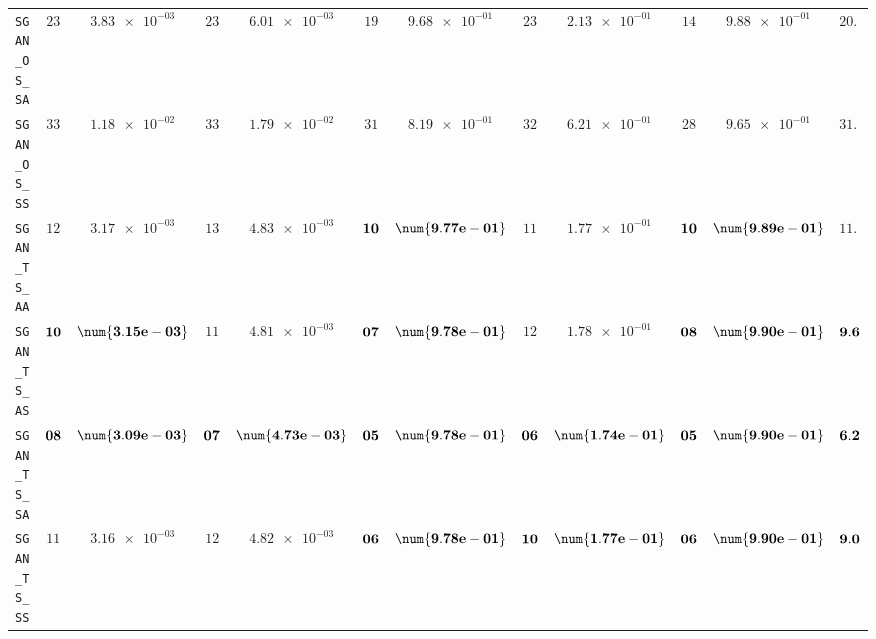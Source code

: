 \begin{xltabular}{\textwidth}{l||cC|cC|cC|cC|cC||c}
	\texttt{SGAN\_OS\_SA} & $ 23$ & $ \num{3.83e-03}$ & $ 23$ & $ \num{6.01e-03}$ & $ 19$ & $ \num{9.68e-01}$ & $ 23$ & $ \num{2.13e-01}$ & $ 14$ & $ \num{9.88e-01}$ & $ 20.4$  \\
	\texttt{SGAN\_OS\_SS} & $ 33$ & $ \num{1.18e-02}$ & $ 33$ & $ \num{1.79e-02}$ & $ 31$ & $ \num{8.19e-01}$ & $ 32$ & $ \num{6.21e-01}$ & $ 28$ & $ \num{9.65e-01}$ & $ 31.4$  \\
	\texttt{SGAN\_TS\_AA} & $ 12$ & $ \num{3.17e-03}$ & $ 13$ & $ \num{4.83e-03}$ & $\bf 10$ & $\bf \num{9.77e-01}$ & $ 11$ & $ \num{1.77e-01}$ & $\bf 10$ & $\bf \num{9.89e-01}$ & $ 11.2$  \\
	\texttt{SGAN\_TS\_AS} & $\bf 10$ & $\bf \num{3.15e-03}$ & $ 11$ & $ \num{4.81e-03}$ & $\bf 07$ & $\bf \num{9.78e-01}$ & $ 12$ & $ \num{1.78e-01}$ & $\bf 08$ & $\bf \num{9.90e-01}$ & $\bf 9.6$  \\
	\texttt{SGAN\_TS\_SA} & $\bf 08$ & $\bf \num{3.09e-03}$ & $\bf 07$ & $\bf \num{4.73e-03}$ & $\bf 05$ & $\bf \num{9.78e-01}$ & $\bf 06$ & $\bf \num{1.74e-01}$ & $\bf 05$ & $\bf \num{9.90e-01}$ & $\bf 6.2$  \\
	\texttt{SGAN\_TS\_SS} & $ 11$ & $ \num{3.16e-03}$ & $ 12$ & $ \num{4.82e-03}$ & $\bf 06$ & $\bf \num{9.78e-01}$ & $\bf 10$ & $\bf \num{1.77e-01}$ & $\bf 06$ & $\bf \num{9.90e-01}$ & $\bf 9.0$  \\ \hline

\end{xltabular}
